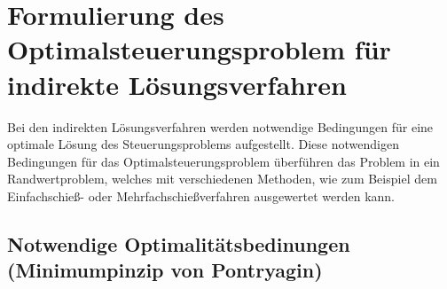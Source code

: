 \chapter{Formulierung des Optimalsteuerungsproblem für indirekte Lösungsverfahren} \label{cha:indirect}

Bei den indirekten Lösungsverfahren werden notwendige Bedingungen für eine optimale Lösung des Steuerungsproblems aufgestellt. Diese notwendigen Bedingungen für das Optimalsteuerungsproblem überführen das Problem in ein  Randwertproblem, welches mit verschiedenen Methoden, wie zum Beispiel dem Einfachschieß- oder Mehrfachschießverfahren \cite{Deuflhard2013,MultipleShoot1962} ausgewertet werden kann.

\section{Notwendige Optimalitätsbedinungen (Minimumpinzip von Pontryagin)}\label{kap:NOpt}
%
